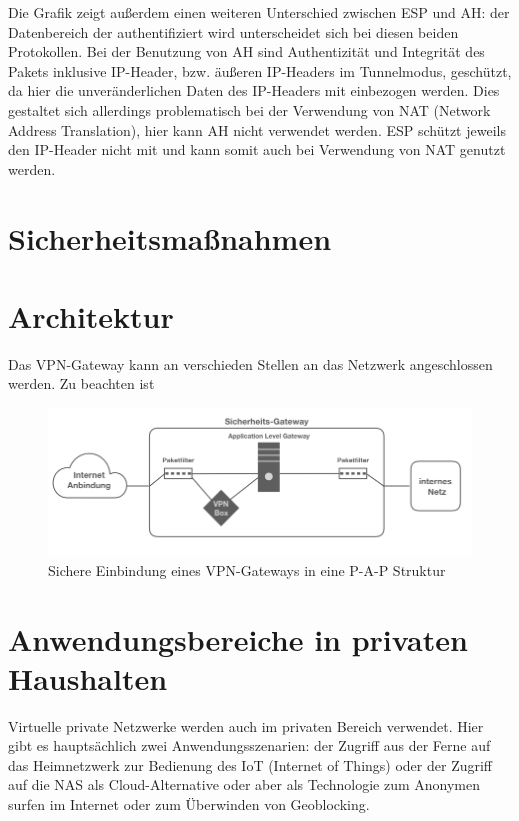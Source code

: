 Die Grafik zeigt außerdem einen weiteren Unterschied zwischen ESP und AH: der Datenbereich der authentifiziert wird unterscheidet sich bei diesen beiden Protokollen. Bei der Benutzung von AH sind Authentizität und Integrität des Pakets inklusive IP-Header, bzw. äußeren IP-Headers im Tunnelmodus,  geschützt, da hier die unveränderlichen Daten des IP-Headers mit einbezogen werden. Dies gestaltet sich allerdings problematisch bei der Verwendung von NAT (Network Address Translation), hier kann AH nicht verwendet werden. 
ESP schützt jeweils den IP-Header nicht mit und kann somit auch bei Verwendung von NAT genutzt werden. 

 


\section{Sicherheitsmaßnahmen}



\section{Architektur}
Das VPN-Gateway kann an verschieden Stellen an das Netzwerk angeschlossen werden. Zu beachten ist

\begin{figure}[h]
	\includegraphics[width=\linewidth]{vpnarchitektur.jpeg}
	\caption{Sichere Einbindung eines VPN-Gateways in eine P-A-P Struktur}
	\label{vpnarch}
\end{figure}



\section{Anwendungsbereiche in privaten Haushalten}

Virtuelle private Netzwerke werden auch im privaten Bereich  verwendet. Hier gibt es hauptsächlich zwei Anwendungsszenarien: der Zugriff aus der Ferne auf das Heimnetzwerk zur Bedienung des IoT (Internet of Things) oder der Zugriff auf die NAS als Cloud-Alternative oder aber als Technologie zum Anonymen surfen im Internet oder zum Überwinden von Geoblocking. 






